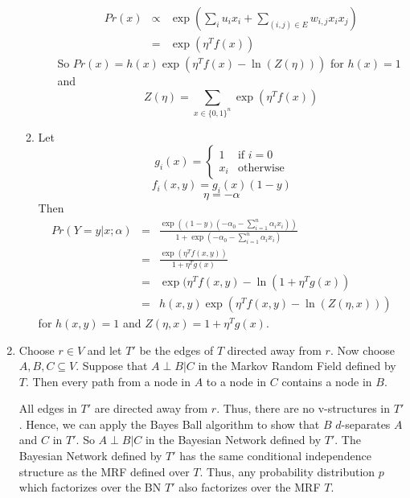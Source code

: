 \documentclass{article}
\begin{document}
\begin{enumerate}
\begin{enumerate}
\begin{enumerate}
					\begin{equation}
						\begin{aligned}
							Pr(x) & \propto & \exp(\sum_i u_ix_i + \sum_{(i, j)\in E}w_{i,j}x_ix_j) \\
							& = & \exp(\eta^T f(x))
						\end{aligned}
					\end{equation}
					So $Pr(x) = h(x)\exp(\eta^T f(x) - \ln(Z(\eta)))$ for $h(x) = 1$ and
					\begin{equation}
						Z(\eta) = \sum_{x\in\{0, 1\}^n}\exp(\eta^T f(x))
					\end{equation}
			\end{enumerate}
			\item
			Let 
			\begin{equation}
				g_i(x) = 
					\begin{cases}
						1 & \mbox{if } i = 0 \\
						x_i & \mbox{otherwise}
					\end{cases}
			\end{equation}
			\begin{equation}
				f_i(x, y) = g_i(x)(1 - y)
			\end{equation}
			\begin{equation}
			\eta = -\alpha
			\end{equation}
			Then 
			\begin{equation}
				\begin{aligned}
					Pr(Y = y| x; \alpha) & = & 
						\frac
						{
							\exp((1-y)(-\alpha_0-\sum_{i = 1}^n\alpha_i x_i))
						}
						{
							1 + \exp(-\alpha_0-\sum_{i = 1}^n\alpha_i x_i)
						} \\
					& = & \frac{\exp(\eta^Tf(x, y))}{1 + \eta^Tg(x)} \\
					& = & \exp(\eta^Tf(x, y) - \ln(1 + \eta^Tg(x)) \\
					& = & h(x, y)\exp(\eta^T f(x, y) - \ln(Z(\eta, x)))
				\end{aligned}
			\end{equation}
			for $h(x, y) = 1$ and $Z(\eta, x) = 1 + \eta^Tg(x)$.
		\end{enumerate}
	\item Choose $r \in V$ and let $T'$ be the edges of $T$ directed away from $r$. Now choose $A, B, C \subseteq V$. Suppose that $A \perp B | C$ in the Markov Random Field defined by $T$. Then every path from a node in $A$ to a node in $C$ contains a node in $B$. 
	
	All edges in $T'$ are directed away from $r$. Thus, there are no v-structures in $T'$. Hence, we can apply the Bayes Ball algorithm to show that $B$ $d$-separates $A$ and $C$ in $T'$.
	So $A \perp B | C$ in the Bayesian Network defined by $T'$. The Bayesian Network defined by $T'$ has the same conditional independence structure as the MRF defined over $T$. Thus, any probability distribution $p$ which factorizes over the BN $T'$ also factorizes over the MRF $T$.


\end{enumerate}
\end{document}
